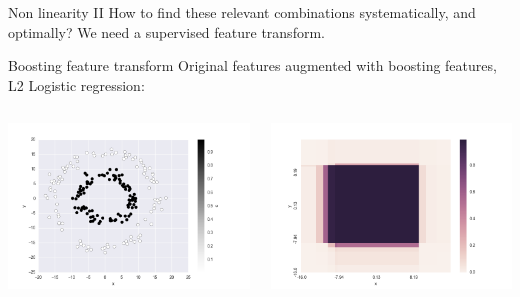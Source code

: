 \documentclass[11pt]{beamer}
\begin{document}
\begin{frame}{Non linearity II}
How to find these relevant combinations systematically, and optimally?
\pause
We need a supervised feature transform.
\end{frame}



\begin{frame}{Boosting feature transform}
Original features augmented with boosting features, L2 Logistic regression:
\begin{columns}
\includegraphics[scale=0.3]{circles_boosting.png} 

\includegraphics[scale=0.3]{circles_boosting_hm.png} 
\end{columns}
\end{frame}
\end{document}
